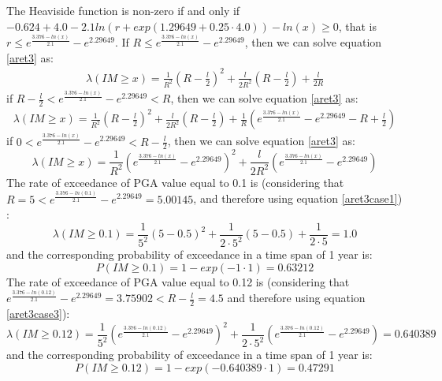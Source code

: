 The Heaviside function is non-zero if and only if $-0.624 + 4.0 - 2.1 ln(r + exp(1.29649 + 0.25 \cdot 4.0)) - ln(x) \geq 0$, that is $r \leq e^{\frac{3.376 - ln(x)}{2.1}} - e^{2.29649}$.
If $R\leq e^{\frac{3.376 - ln(x)}{2.1}} - e^{2.29649}$, then we can solve equation \ref{aret3} as:
\begin{eqnarray}
\label{aret3case1}
\lambda(IM \geq x) = \frac{1}{R^{2}}(R - \frac{l}{2})^{2} + \frac{l}{2R^{2}}(R - \frac{l}{2}) + \frac{l}{2R}
\end{eqnarray}
if $R-\frac{l}{2}< e^{\frac{3.376 - ln(x)}{2.1}} - e^{2.29649} < R$, then we can solve equation \ref{aret3} as:
\begin{eqnarray}
\label{aret3case2}
\lambda(IM \geq x) = \frac{1}{R^{2}}(R - \frac{l}{2})^{2} + \frac{l}{2R^{2}}(R - \frac{l}{2}) + \frac{1}{R}(e^{\frac{3.376 - ln(x)}{2.1}} - e^{2.29649} - R + \frac{l}{2})
\end{eqnarray}
if $0 < e^{\frac{3.376 - ln(x)}{2.1}} - e^{2.29649} < R - \frac{l}{2} $, then we can solve equation \ref{aret3} as:
\begin{equation}
\label{aret3case3}
\lambda(IM \geq x) = \frac{1}{R^{2}} (e^{\frac{3.376 - ln(x)}{2.1}} - e^{2.29649})^{2} + \frac{l}{2R^{2}}(e^{\frac{3.376 - ln(x)}{2.1}} - e^{2.29649})
\end{equation}
The rate of exceedance of PGA value equal to 0.1 is (considering that  $R = 5 < e^{\frac{3.376 - ln(0.1)}{2.1}} - e^{2.29649} = 5.00145$, and therefore using
equation \ref{aret3case1}) :
\begin{equation}
\lambda(IM \geq 0.1) = \frac{1}{5^{2}}(5 - 0.5)^{2} + \frac{1}{2\cdot5^{2}}(5 - 0.5) + \frac{1}{2\cdot5} = 1.0
\end{equation}
and the corresponding probability of exceedance in a time span of 1 year is:
\begin{equation}
P(IM \geq 0.1) = 1 - exp(-1 \cdot 1) = 0.63212
\end{equation}
The rate of exceedance of PGA value equal to 0.12 is (considering that $e^{\frac{3.376 - ln(0.12)}{2.1}} - e^{2.29649} = 3.75902 < R - \frac{l}{2} = 4.5$ and therefore using equation \ref{aret3case3}):
\begin{equation}
\lambda(IM \geq 0.12) = \frac{1}{5^{2}} (e^{\frac{3.376 - ln(0.12)}{2.1}} - e^{2.29649})^{2} + \frac{1}{2\cdot 5^{2}}(e^{\frac{3.376 - ln(0.12)}{2.1}} - e^{2.29649}) = 0.640389
\end{equation}
and the corresponding probability of exceedance in a time span of 1 year is:
\begin{equation}
P(IM \geq 0.12) = 1 - exp(-0.640389 \cdot 1) = 0.47291
\end{equation}
